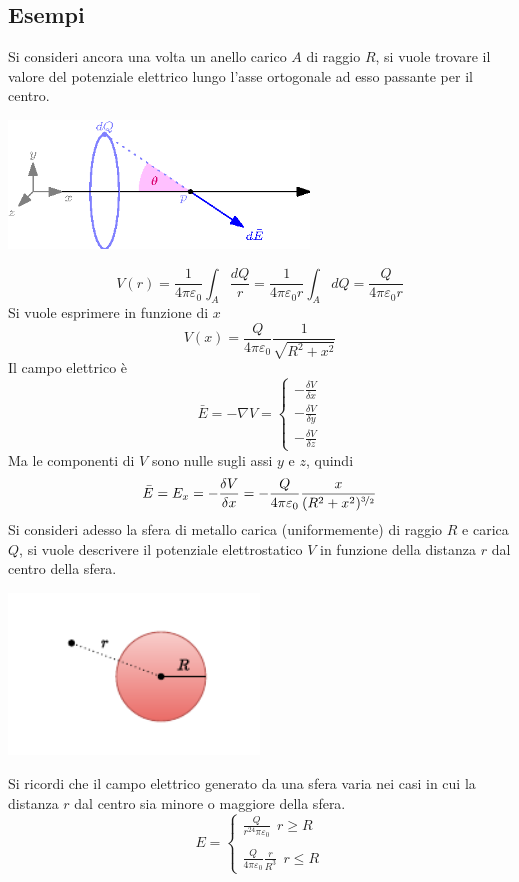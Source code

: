 \documentclass[10pt, letterpaper]{report}
\begin{document}
\subsection{Esempi}
Si consideri ancora una volta un anello carico $A$ di raggio $R$, si vuole trovare il valore del potenziale elettrico lungo l'asse ortogonale ad esso passante per il centro.
\begin{center}
    \includegraphics[width=0.6\textwidth]{images/anello1.eps}
\end{center}
$$ V(r)=\frac{1}{4\pi\varepsilon_0}\int_A \frac{dQ}{r}=\frac{1}{4\pi\varepsilon_0r}\int_A dQ=\frac{Q}{4\pi\varepsilon_0r}$$
Si vuole esprimere in funzione di $x$
$$ V(x)=\frac{Q}{4\pi\varepsilon_0}\frac{1}{\sqrt{R^2+x^2}}$$
Il campo elettrico è 
$$ \bar E = -\nabla V = \begin{cases}
    -\frac{\delta V}{\delta x}\\
    -\frac{\delta V}{\delta y}\\
   -\frac{\delta V}{\delta z}
\end{cases}$$
Ma le componenti di $V$ sono nulle sugli assi $y$ e $z$, quindi 
$$ \bar E = E_x=-\frac{\delta V}{\delta x}=-\frac{Q}{4\pi\varepsilon_0} \frac{x}{(R^2+x^2)^{\nicefrac{3}{2}}} $$
Si consideri adesso la sfera di metallo carica (uniformemente) di raggio $R$ e carica $Q$, si vuole descrivere il potenziale elettrostatico $V$ in funzione della distanza $r$ dal centro della sfera.\begin{center}
    \includegraphics[width=0.5\textwidth]{images/sferaCarica2.pdf}
\end{center}
Si ricordi che il campo elettrico generato da una sfera varia nei casi in cui la distanza $r$ dal centro sia minore o maggiore della sfera. 
$$ E=\begin{cases}
   \displaystyle \frac{Q}{r^24\pi\varepsilon_0} \ \ r\ge R \\ \\
   \displaystyle  \frac{Q}{4\pi\varepsilon_0}\frac{r}{R^3}\ \ r\le R 
\end{cases}$$
\end{document}
